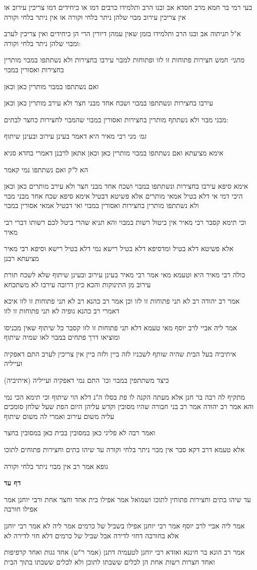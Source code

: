 \documentclass[12pt, openany]{book}
\newcommand{\sethebfont}{
\fontsize{10.5pt}{21.0pt} \selectfont
}
\newcommand{\textblock}[1]{
{\sethebfont #1\\}	
}
\newcommand{\sectname}{}
\newcommand{\newsection}[1]{
	\addcontentsline{toc}{section}{#1}
	\renewcommand{\sectname}{#1}	
	\vspace{-\baselineskip}
	\begin{center}
		\textbf{%
\fontsize{16pt}{16pt}\selectfont
			#1}
	\end{center}
	\vspace{-\baselineskip}
	\nopagebreak
}
\begin{document}
\textblock{בעי רמי בר חמא מרב חסדא אב ובנו הרב ותלמידו כרבים דמו או כיחידים דמו צריכין עירוב או אין צריכין עירוב מבוי שלהן ניתר בלחי וקורה או אין ניתר בלחי וקורה}
\textblock{א"ל תניתוה אב ובנו הרב ותלמידו בזמן שאין עמהן דיורין הרי הן כיחידים ואין צריכין לערב ומבוי שלהן ניתר בלחי וקורה:}
\textblock{{\large\emph{מתני׳}} חמש חצירות פתוחות זו לזו ופתוחות למבוי עירבו בחצירות ולא נשתתפו במבוי מותרין בחצירות ואסורין במבוי}
\textblock{ואם נשתתפו במבוי מותרין כאן וכאן}
\textblock{עירבו בחצירות ונשתתפו במבוי ושכח אחד מבני חצר ולא עירב מותרין כאן וכאן}
\textblock{מבני מבוי ולא נשתתף מותרין בחצירות ואסורין במבוי שהמבוי לחצירות כחצר לבתים:}
\textblock{{\large\emph{גמ׳}} מני רבי מאיר היא דאמר בעינן עירוב ובעינן שיתוף}
\textblock{אימא מציעתא ואם נשתתפו במבוי מותרין כאן וכאן אתאן לרבנן דאמרי בחדא סגיא}
\textblock{הא ל"ק ואם נשתתפו נמי קאמר}
\textblock{אימא סיפא עירבו בחצירות ונשתתפו במבוי ושכח אחד מבני חצר ולא עירב מותרים כאן וכאן היכי דמי אי דלא בטיל אמאי מותרים אלא פשיטא דבטיל אימא סיפא שכח אחד מבני מבוי ולא נשתתפו מותרין בחצירות ואסורין במבוי ואי דבטיל אמאי אסורין במבוי}
\textblock{וכי תימא קסבר רבי מאיר אין ביטול רשות במבוי והא תניא שהרי ביטל לכם רשותו דברי רבי מאיר}
\textblock{אלא פשיטא דלא בטיל ומדסיפא דלא בטיל רישא נמי דלא בטיל רישא וסיפא רבי מאיר מציעתא רבנן}
\textblock{כולה רבי מאיר היא וטעמא מאי אמר רבי מאיר בעינן עירוב ובעינן שיתוף שלא לשכח תורת עירוב מן התינוקות והכא כיון דרובה עירבו לא משתכחא}
\textblock{אמר רב יהודה רב לא תני פתוחות זו לזו וכן אמר רב כהנא רב לא תני פתוחות זו לזו איכא דאמרי רב כהנא גופיה לא תני פתוחות זו לזו}
\textblock{אמר ליה אביי לרב יוסף מאי טעמא דלא תני פתוחות זו לזו קסבר כל שיתוף שאין מכניסו ומוציאו דרך פתחים במבוי לאו שמיה שיתוף}
\textblock{איתיביה בעל הבית שהיה שותף לשכניו לזה ביין ולזה ביין אין צריכין לערב התם דאפקיה ועייליה}
\textblock{(איתיביה) כיצד משתתפין במבוי וכו' התם נמי דאפקיה ועייליה}
\textblock{מתקיף לה רבה בר חנן אלא מעתה הקנה לו פת בסלו ה"נ דלא הוי שיתוף וכי תימא הכי נמי והא אמר רב יהודה אמר רב בני חבורה שהיו מסובין וקדש עליהן היום הפת שעל שלחן סומכים עליה משום עירוב ואמרי לה משום שיתוף}
\textblock{ואמר רבה לא פליגי כאן במסובין בבית כאן במסובין בחצר}
\textblock{אלא טעמא דרב דקא סבר אין מבוי ניתר בלחי וקורה עד שיהו בתים וחצירות פתוחים לתוכו}
\textblock{גופא אמר רב אין מבוי ניתר בלחי וקורה}
\newsection{דף עד}
\textblock{עד שיהו בתים וחצירות פתוחין לתוכו ושמואל אמר אפילו בית אחד וחצר אחת ורבי יוחנן אמר אפילו חורבה}
\textblock{אמר ליה אביי לרב יוסף אמר רבי יוחנן אפילו בשביל של כרמים אמר ליה לא אמר רבי יוחנן אלא בחורבה דחזי לדירה אבל שביל של כרמים דלא חזי לדירה לא}
\textblock{אמר רב הונא בר חיננא ואזדא רבי יוחנן לטעמיה דתנן (אמר ר"ש) אחד גגות ואחד קרפיפות ואחד חצרות רשות אחת הן לכלים ששבתו לתוכן ולא לכלים ששבתו בתוך הבית}
\end{document}
